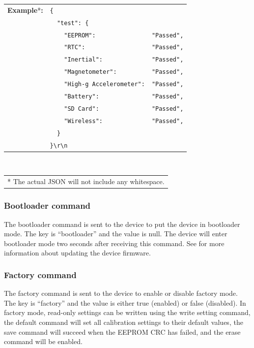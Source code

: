 \begin{table}[H]
    \begin{tabular}{l l l}
        \textbf{Example}*\textbf{:} & \texttt{\{}\\
        & \texttt{~~"test":~\{} &\\
        & \texttt{~~~~"EEPROM":} & \texttt{"Passed",}\\
        & \texttt{~~~~"RTC":} & \texttt{"Passed",}\\
        & \texttt{~~~~"Inertial":} & \texttt{"Passed",}\\
        & \texttt{~~~~"Magnetometer":} & \texttt{"Passed",}\\
        & \texttt{~~~~"High-g Accelerometer":} & \texttt{"Passed",}\\
        & \texttt{~~~~"Battery":} & \texttt{"Passed",}\\
        & \texttt{~~~~"SD Card":} & \texttt{"Passed",}\\
        & \texttt{~~~~"Wireless":} & \texttt{"Passed",}\\
        & \texttt{~~\}}\\
        & \texttt{\}\textbackslash r\textbackslash n}\\
    \end{tabular}\\
    \begin{tabular}{l}
        \\
        \footnotesize{* The actual \acs{JSON} will not include any whitespace.}
    \end{tabular}
\end{table}

\subsubsection{Bootloader command}

The bootloader command is sent to the device to put the device in bootloader mode.  The key is \enquote{bootloader} and the value is null.  The device will enter bootloader mode two seconds after receiving this command.  See  for more information about updating the device firmware.


\subsubsection{Factory command}

The factory command is sent to the device to enable or disable factory mode.  The key is \enquote{factory} and the value is either true (enabled) or false (disabled).  In factory mode, read-only settings can be written using the write setting command, the default command will set all calibration settings to their default values, the save command will succeed when the \ac{EEPROM} \ac{CRC} has failed, and the erase command will be enabled.

